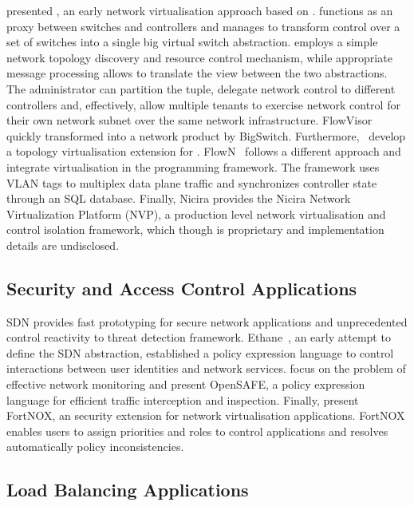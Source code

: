  presented \flv, an early network virtualisation approach
based on \of.  \flv functions as an \of proxy between switches and controllers
and manages to transform control over a set of switches into a single big
virtual switch abstraction.  \flv employs a simple network topology discovery
and resource control mechanism, while appropriate message processing allows to
translate the view between the two abstractions.  The administrator can
partition the \of tuple, delegate network control to different controllers and,
effectively, allow multiple tenants to exercise network control for their own
network subnet over the same network infrastructure.  FlowVisor quickly
transformed into a network product by BigSwitch. Furthermore,
~develop a topology virtualisation extension for \flv.
FlowN~ follows a different approach and integrate
virtualisation in the  programming framework.  The framework uses VLAN tags to
multiplex data plane traffic and synchronizes controller state through an SQL
database. Finally, Nicira provides the Nicira Network Virtualization Platform
(NVP), a production level network virtualisation and control isolation
framework, which though is proprietary and implementation details are
undisclosed. 

\subsection{Security and Access Control Applications}

SDN provides fast  prototyping for secure network applications and
unprecedented control reactivity to threat detection framework.
Ethane~, an  early attempt to define the SDN
abstraction, established a policy expression language to control interactions
between user identities and network services.   focus on the
problem of effective network monitoring and present OpenSAFE, a policy
expression language for efficient traffic interception and inspection.  Finally,
 present FortNOX, an security extension  for network
virtualisation applications. FortNOX enables users to assign priorities and
roles to control applications and resolves automatically policy inconsistencies. 
 
\subsection{Load Balancing Applications}

